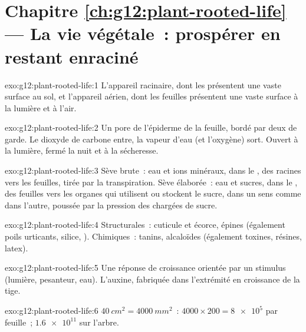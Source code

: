 \section*{Chapitre \ref{ch:g12:plant-rooted-life} --- La vie végétale~: prospérer en restant enraciné}

\begin{solution}{exo:g12:plant-rooted-life:1}
L'appareil racinaire, dont les  présentent une vaste
surface au sol, et l'appareil aérien, dont les feuilles présentent une
vaste surface à la lumière et à l'air.
\end{solution}

\begin{solution}{exo:g12:plant-rooted-life:2}
Un pore de l'épiderme de la feuille, bordé par deux  de garde.
Le dioxyde de carbone entre, la vapeur d'eau (et l'oxygène) sort.
Ouvert à la lumière, fermé la nuit et à la sécheresse.
\end{solution}

\begin{solution}{exo:g12:plant-rooted-life:3}
Sève brute~: eau et ions minéraux, dans le , des racines vers
les feuilles, tirée par la transpiration. Sève élaborée~: eau et
sucres, dans le , des feuilles vers les organes qui utilisent
ou stockent le sucre, dans un sens comme dans l'autre, poussée par la
pression des  chargées de sucre.
\end{solution}

\begin{solution}{exo:g12:plant-rooted-life:4}
Structurales~: cuticule et écorce, épines (également poils urticants,
silice, ). Chimiques~: tanins, alcaloïdes (également
toxines, résines, latex).
\end{solution}

\begin{solution}{exo:g12:plant-rooted-life:5}
Une réponse de croissance orientée par un stimulus (lumière,
pesanteur, eau). L'auxine, fabriquée dans l'extrémité en croissance de
la tige.
\end{solution}

\begin{solution}{exo:g12:plant-rooted-life:6}
$\qty{40}{cm^2} = \qty{4000}{mm^2}$~: $4000 \times 200 = \num{8e5}$
 par feuille~; $\num{1.6e11}$ sur l'arbre.
\end{solution}

